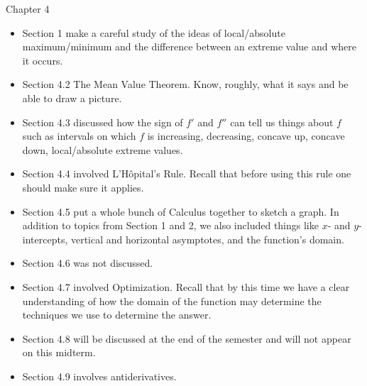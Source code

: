 \documentclass[11pt,fleqn]{article}
\begin{document}
Chapter 4\\
\begin{itemize}
	\item Section 1 make a careful study of the ideas of local/absolute maximum/minimum and the difference between an extreme value and where it occurs.
	\item Section 4.2 The Mean Value Theorem. Know, roughly, what it says and be able to draw a picture.
	\item Section 4.3 discussed how the sign of $f'$ and $f''$ can tell us things about $f$ such as intervals on which $f$ is increasing, decreasing, concave up, concave down, local/absolute extreme values.
	\item Section 4.4 involved L'H\^{o}pital's Rule. Recall that before using this rule one should make sure it applies.
	\item Section 4.5 put a whole bunch of Calculus together to sketch a graph. In addition to topics from Section 1 and 2, we also included things like $x$- and $y$-intercepts, vertical and horizontal asymptotes, and the function's domain.
	\item Section 4.6 was not discussed.
	\item Section 4.7 involved Optimization. Recall that by this time we have a clear  understanding of how the  domain of the function may determine the techniques we use to determine the answer. 
	\item Section 4.8 will be discussed at the end of the semester and will not appear on this midterm.
	\item Section 4.9 involves antiderivatives.
\end{itemize}
\newpage
\end{document}
